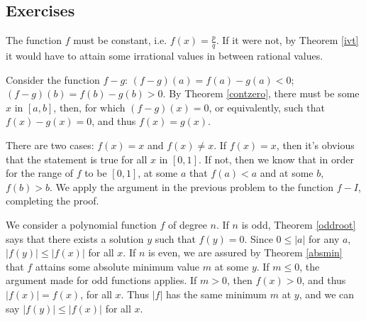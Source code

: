 \subsection{Exercises}
\begin{problem}[7-5]
The function $f$ must be constant, i.e. $f(x) = \frac{p}{q}$. If it were not, by Theorem \ref{ivt} it would have to attain some irrational values in between rational values.
\end{problem}

\begin{problem}[7-10]
Consider the function $f - g$: $(f - g)(a) = f(a) - g(a) < 0$; $(f - g)(b) = f(b) - g(b) > 0$. By Theorem \ref{contzero}, there must be some $x$ in $[a, b]$, then, for which $(f - g)(x) = 0$, or equivalently, such that $f(x) - g(x) = 0$, and thus $f(x) = g(x)$.
\end{problem}

\begin{problem}[7-11]
There are two cases: $f(x) = x$ and $f(x) \ne x$. If $f(x) = x$, then it's obvious that the statement is true for all $x$ in $[0, 1]$. If not, then we know that in order for the range of $f$ to be $[0, 1]$, at some $a$ that $f(a) < a$ and at some $b$, $f(b) > b$. We apply the argument in the previous problem to the function $f - I$, completing the proof.
\end{problem}

\begin{problem}[7-16]
We consider a polynomial function $f$ of degree $n$. If $n$ is odd, Theorem \ref{oddroot} says that there exists a solution $y$ such that $f(y) = 0$. Since $0 \le |a|$ for any $a$, $|f(y)| \le |f(x)|$ for all $x$. If $n$ is even, we are assured by Theorem \ref{absmin} that $f$ attains some absolute minimum value $m$ at some $y$. If $m \le 0$, the argument made for odd functions applies. If $m > 0$, then $f(x) > 0$, and thus $|f(x)| = f(x)$, for all $x$. Thus $|f|$ has the same minimum $m$ at $y$, and we can say $|f(y)| \le |f(x)|$ for all $x$.
\end{problem}

